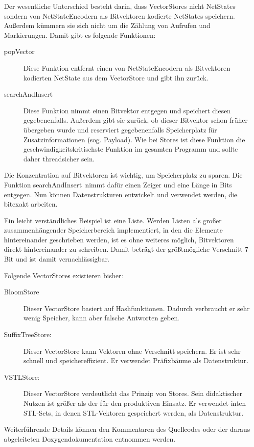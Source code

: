 \documentclass[12pt,a4paper,titlepage]{scrartcl}
\renewcommand \( {\left (}
\renewcommand \) {\right )}
\renewcommand \[ {\left [}
\renewcommand \] {\right ]}
\newcommand \Flqq {\flqq\ }
\begin{document}
Der wesentliche Unterschied besteht darin, dass VectorStores nicht NetStates sondern von NetStateEncodern als Bitvektoren kodierte NetStates speichern. Außerdem kümmern sie sich nicht um die Zählung von Aufrufen und Markierungen. Damit gibt es folgende Funktionen:
\begin{description}
\item[popVector] Diese Funktion entfernt einen von NetStateEncodern als Bitvektoren kodierten NetState aus dem VectorStore und gibt ihn zurück. 
\item[searchAndInsert] Diese Funktion nimmt einen Bitvektor entgegen und speichert diesen gegebenenfalls. Außerdem gibt sie zurück, ob dieser Bitvektor schon früher übergeben wurde und reserviert gegebenenfalls Speicherplatz für Zusatzinformationen (sog. Payload). Wie bei Stores ist diese Funktion die geschwindigkeitskritischste Funktion im gesamten Programm und sollte daher threadsicher sein.
\end{description}
Die Konzentration auf Bitvektoren ist wichtig, um Speicherplatz zu sparen. Die Funktion \frqq searchAndInsert\Flqq nimmt dafür einen Zeiger und eine Länge in Bits entgegen. Nun können Datenstrukturen entwickelt und verwendet werden, die bitexakt arbeiten.

Ein leicht verständliches Beispiel ist eine Liste. Werden Listen als großer zu\-sammen\-hängen\-der Speicherbereich implementiert, in den die Elemente hintereinander geschrieben werden, ist es ohne weiteres möglich, Bitvektoren direkt hintereinander zu schreiben. Damit beträgt der größtmögliche Verschnitt 7 Bit und ist damit vernachlässigbar.

Folgende VectorStores existieren bisher:
\begin{description}
\item[BloomStore] Dieser VectorStore basiert auf Hashfunktionen. Dadurch verbraucht er sehr wenig Speicher, kann aber falsche Antworten geben.
\item[SuffixTreeStore:] Dieser VectorStore kann Vektoren ohne Verschnitt speichern. Er ist sehr schnell und speichereffizient. Er verwendet Präfixbäume als Datenstruktur.
\item[VSTLStore:] Dieser VectorStore verdeutlicht das Prinzip von Stores. Sein didaktischer Nutzen ist größer als der für den produktiven Einsatz. Er verwendet inten STL-Sets, in denen STL-Vektoren gespeichert werden, als Datenstruktur.
\end{description}

Weiterführende Details können den Kommentaren des Quellcodes oder der daraus abgeleiteten Doxygendokumentation entnommen werden.
\end{document}
